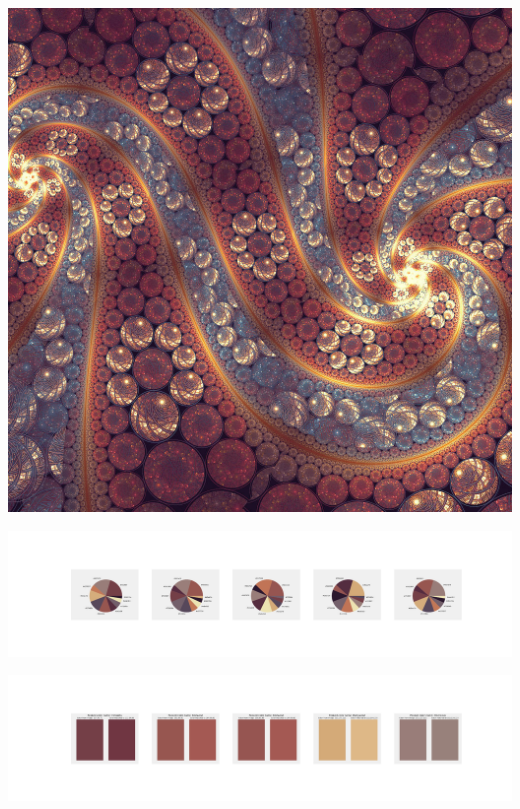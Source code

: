 \documentclass[11pt]{article}
\begin{document}
\begin{landscape}
    \begin{center}
    \includegraphics[width=\textwidth]{./nbimg/file (397).jpg}
    \end{center}

    \begin{center}
    \includegraphics[width=250mm]{./nbimg/pie-330.jpg}
    \end{center}

    \begin{center}
    \includegraphics[width=250mm]{./nbimg/peak-330.jpg}
    \end{center}
    


\end{landscape}
\end{document}
